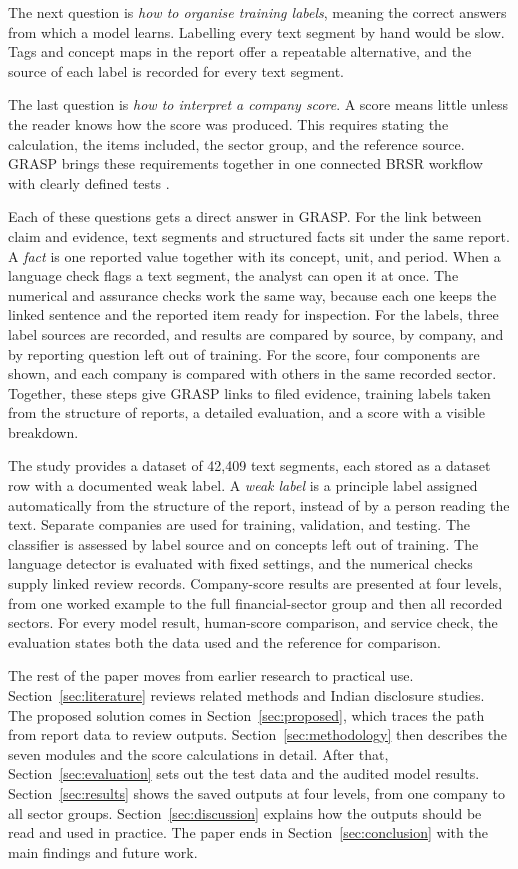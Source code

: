 The next question is \emph{how to organise training labels}, meaning the correct answers from which a model learns. Labelling every text segment by hand would be slow. Tags and concept maps in the report offer a repeatable alternative, and the source of each label is recorded for every text segment.

The last question is \emph{how to interpret a company score}. A score means little unless the reader knows how the score was produced. This requires stating the calculation, the items included, the sector group, and the reference source. GRASP brings these requirements together in one connected BRSR workflow with clearly defined tests \cite{calamai2025,garg2025}.

Each of these questions gets a direct answer in GRASP. For the link between claim and evidence, text segments and structured facts sit under the same report. A \emph{fact} is one reported value together with its concept, unit, and period. When a language check flags a text segment, the analyst can open it at once. The numerical and assurance checks work the same way, because each one keeps the linked sentence and the reported item ready for inspection. For the labels, three label sources are recorded, and results are compared by source, by company, and by reporting question left out of training. For the score, four components are shown, and each company is compared with others in the same recorded sector. Together, these steps give GRASP links to filed evidence, training labels taken from the structure of reports, a detailed evaluation, and a score with a visible breakdown.

The study provides a dataset of 42,409 text segments, each stored as a dataset row with a documented weak label. A \emph{weak label} is a principle label assigned automatically from the structure of the report, instead of by a person reading the text. Separate companies are used for training, validation, and testing. The classifier is assessed by label source and on concepts left out of training. The language detector is evaluated with fixed settings, and the numerical checks supply linked review records. Company-score results are presented at four levels, from one worked example to the full financial-sector group and then all recorded sectors. For every model result, human-score comparison, and service check, the evaluation states both the data used and the reference for comparison.

The rest of the paper moves from earlier research to practical use. Section~\ref{sec:literature} reviews related methods and Indian disclosure studies. The proposed solution comes in Section~\ref{sec:proposed}, which traces the path from report data to review outputs. Section~\ref{sec:methodology} then describes the seven modules and the score calculations in detail. After that, Section~\ref{sec:evaluation} sets out the test data and the audited model results. Section~\ref{sec:results} shows the saved outputs at four levels, from one company to all sector groups. Section~\ref{sec:discussion} explains how the outputs should be read and used in practice. The paper ends in Section~\ref{sec:conclusion} with the main findings and future work.